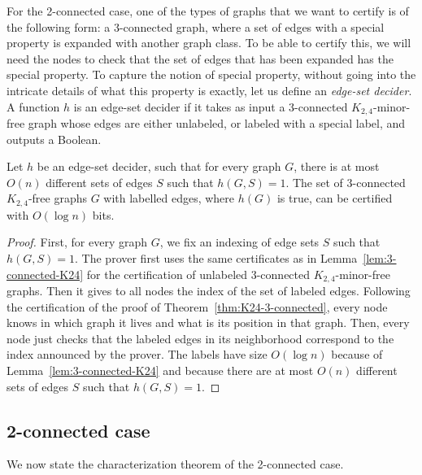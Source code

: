 \documentclass[a4paper,thm-restate,USenglish]{lipics-v2019}
\begin{document}
For the 2-connected case, one of the types of graphs that we want to certify is of the following form: a 3-connected graph, where a set of edges with a special property is expanded with another graph class. 
To be able to certify this, we will need the nodes to check that the set of edges that has been expanded has the special property. 
To capture the notion of special property, without going into the intricate details of what this property is exactly, let us define an \emph{edge-set decider}. 
A function $h$ is an edge-set decider if it takes as input a 3-connected $K_{2,4}$-minor-free graph whose edges are either unlabeled, or labeled with a special label, and outputs a Boolean.

\begin{lemma}\label{lem:h-label}
Let $h$ be an edge-set decider, such that for every graph $G$, there is at most $O(n)$ different sets of edges $S$ such that $h(G,S)=1$.
The set of 3-connected $K_{2,4}$-free graphs $G$ with labelled edges, where $h(G)$ is true, can be certified with $O(\log n)$ bits. 
\end{lemma}

\begin{proof}
First, for every graph $G$, we fix an indexing of edge sets $S$ such that $h(G,S)=1$.
The prover first uses the same certificates as in Lemma~\ref{lem:3-connected-K24} for the certification of unlabeled 3-connected $K_{2,4}$-minor-free graphs. 
Then it gives to all nodes the index of the set of labeled edges.
Following the certification of the proof of Theorem~\ref{thm:K24-3-connected}, every node knows in which graph it lives and what is its position in that graph. Then, every node just checks that the labeled edges in its neighborhood correspond to the index announced by the prover. The labels have size $O(\log n)$ because of Lemma~\ref{lem:3-connected-K24} and because there are at most $O(n)$ different sets of edges $S$ such that $h(G,S)=1$.
\end{proof}

\subsection{2-connected case}

We now state the characterization theorem of the 2-connected case. 
\end{document}

